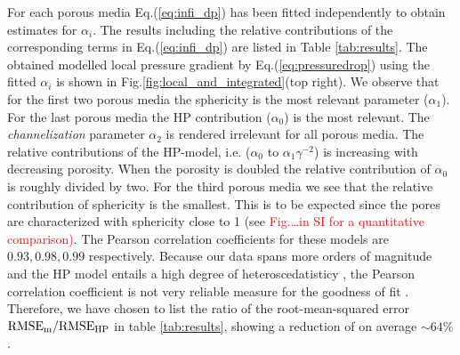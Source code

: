 \documentclass[draft]{agujournal2019}
\begin{document}
For each porous media Eq.(\ref{eq:infi_dp}) has been fitted independently to obtain estimates for $\alpha_i$. The results including the relative contributions of the corresponding terms in Eq.(\ref{eq:infi_dp}) are listed in Table \ref{tab:results}. The obtained modelled local pressure gradient by Eq.(\ref{eq:pressuredrop}) using the fitted $\alpha_i$ is shown in Fig.\ref{fig:local_and_integrated}(top right). We observe that for the first two porous media the sphericity is the most relevant parameter ($\alpha_1$). For the last porous media the HP contribution ($\alpha_0$) is the most relevant. The \textit{channelization} parameter $\alpha_2$ is rendered irrelevant for all porous media.  The relative contributions of the HP-model, i.e. ($\alpha_0$ to $\alpha_1\gamma^{-2}$) is increasing with decreasing porosity. When the porosity is doubled the relative contribution of $\alpha_0$ is roughly divided by two. For the third porous media we see that the relative contribution of sphericity is the smallest. This is to be expected since the pores are characterized with sphericity close to 1 (see \textcolor{red}{Fig.\ldots in SI for a quantitative comparison)}. The Pearson correlation coefficients for these models are $0.93, 0.98, 0.99$ respectively. Because our data spans more orders of magnitude and the HP model entails a high degree of heteroscedatisticy , the Pearson correlation coefficient is not very reliable measure for the goodness of fit . Therefore, we have chosen to list the ratio of the root-mean-squared error $\rm{RMSE}_m/\rm{RMSE}_{HP}$ in table \ref{tab:results}, showing a reduction of on average $\sim64\%$. 


\begin{table}[htbp!]
\caption{Summary of the geometrical and fitting parameters}
\end{table}
\end{document}
